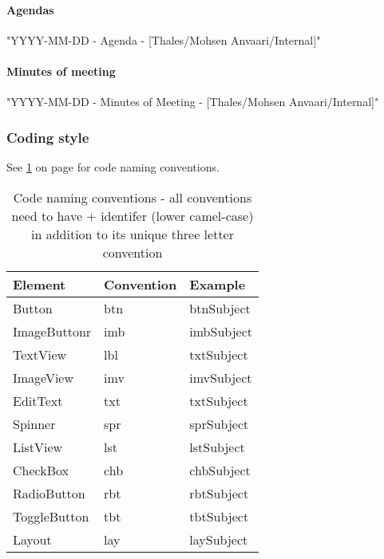 \paragraph{Agendas}\hfill
\newline
"YYYY-MM-DD - Agenda - [Thales/Mohsen Anvaari/Internal]"

\paragraph{Minutes of meeting}\hfill
\newline
"YYYY-MM-DD - Minutes of Meeting - [Thales/Mohsen Anvaari/Internal]"

\subsubsection{Coding style}
See \ref{tab:namingconventions} on page \pageref{tab:namingconventions} for code naming conventions.
\begin{table}
\begin{tabular}{l|l|l}
\textbf{Element} & \textbf{Convention} & \textbf{Example} \\ \hline \hline
Button & btn & btnSubject \\ \hline
ImageButtonr & imb & imbSubject \\ \hline
TextView & lbl & txtSubject \\ \hline
ImageView & imv & imvSubject \\ \hline
EditText & txt & txtSubject \\ \hline
Spinner & spr & sprSubject \\ \hline
ListView & lst & lstSubject \\ \hline
CheckBox & chb & chbSubject \\ \hline
RadioButton & rbt & rbtSubject \\ \hline
ToggleButton & tbt & tbtSubject \\ \hline
Layout & lay & laySubject 
\end{tabular}
\caption{Code naming conventions - all conventions need to have + identifer (lower camel-case) in addition to its unique three letter convention }\label{tab:namingconventions}
\end{table}
